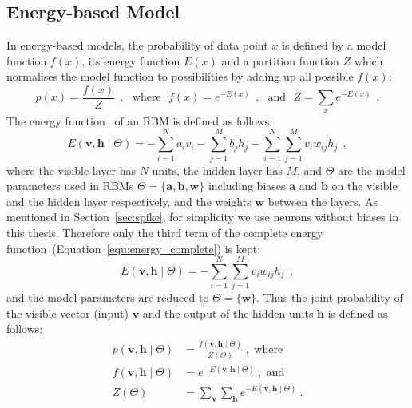 \subsection{Energy-based Model}
In energy-based models, the probability of data point $x$ is defined by a model function $f(x)$, its energy function $E(x)$ and a partition function $Z$ which normalises the model function to possibilities by adding up all possible $f(x)$:
\begin{equation}
 p(x) = \dfrac{f(x)}{Z}~~, \textrm{~~where~~} f(x) =e^{-E(x)}~~,  \textrm{~~and~~}
 Z = \sum_{x} e^{-E(x)}~~.
\end{equation} 
The energy function~\citep{hopfield1982neural} of an RBM is defined as follows:
\begin{equation}
E(\mathbf{v}, \mathbf{h} \mid \Theta)= -\sum_{i=1}^N a_i v_i - \sum_{j=1}^M b_j h_j - \sum_{i=1}^N \sum_{j=1}^M v_i w_{ij} h_j~~,
\label{equ:energy_complete}
\end{equation}
where the visible layer has $ N $ units, the hidden layer has $ M $, and $ \Theta$ are the model parameters used in RBMs $ \Theta =\{\mathbf{a}, \mathbf{b}, \mathbf{w}\} $ including biases $\mathbf{a}$ and $\mathbf{b}$ on the visible and the hidden layer respectively, and the weights $\mathbf{w}$ between the layers.
As mentioned in Section~\ref{sec:spike}, for simplicity we use neurons without biases in this thesis.
Therefore only the third term of the complete energy function~(Equation~\ref{equ:energy_complete}) is kept:
\begin{equation}
E(\mathbf{v}, \mathbf{h} \mid \Theta)= - \sum_{i=1}^N \sum_{j=1}^M v_i w_{ij} h_j~~,
\label{equ:rbm_energy}
\end{equation}
and the model parameters are reduced to  $ \Theta = \{\mathbf{w}\} $.
Thus the joint probability of the visible vector (input) $\mathbf{v}$ and the output of the hidden units $\mathbf{h}$ is defined as follows: 
\begin{equation}
\begin{aligned}
p(\mathbf{v}, \mathbf{h} \mid \Theta) &=\frac{f(\mathbf{v}, \mathbf{h} \mid \Theta)}{Z(\Theta)}~,  \textrm{~where~} \\
f(\mathbf{v}, \mathbf{h} \mid \Theta) &=e^{-E(\mathbf{v}, \mathbf{h} \mid \Theta)}~,  \textrm{~and~} \\
Z(\Theta) &= \sum_{\mathbf{v}} \sum_{\mathbf{h}} e^{-E(\mathbf{v}, \mathbf{h} \mid \Theta)}~.
\end{aligned}
\label{equ:rbm_prob}
\end{equation}

